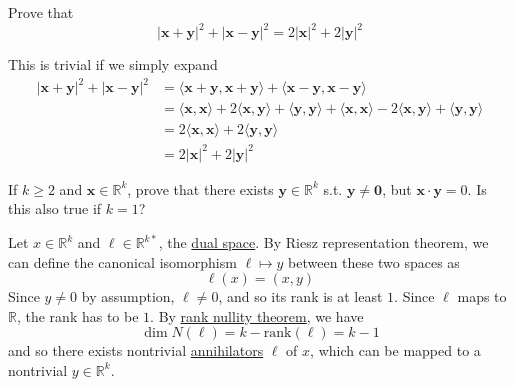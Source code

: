   \begin{exercise}[Rudin 1.17]
    Prove that
    \begin{equation}
      |\mathbf{x} + \mathbf{y}|^2 + |\mathbf{x} - \mathbf{y}|^2 = 2|\mathbf{x}|^2 + 2|\mathbf{y}|^2
    \end{equation}
  \end{exercise}
  \begin{solution}
    This is trivial if we simply expand 
    \begin{align}
      |\mathbf{x} + \mathbf{y}|^2 + |\mathbf{x} - \mathbf{y}|^2 & = \langle \mathbf{x} + \mathbf{y}, \mathbf{x} + \mathbf{y} \rangle + \langle \mathbf{x} - \mathbf{y}, \mathbf{x} - \mathbf{y} \rangle \\
      & = \langle \mathbf{x}, \mathbf{x} \rangle + 2 \langle \mathbf{x}, \mathbf{y} \rangle + \langle \mathbf{y}, \mathbf{y} \rangle + \langle \mathbf{x}, \mathbf{x} \rangle - 2 \langle \mathbf{x}, \mathbf{y} \rangle + \langle \mathbf{y}, \mathbf{y} \rangle \\
      & = 2 \langle \mathbf{x}, \mathbf{x} \rangle + 2 \langle \mathbf{y}, \mathbf{y} \rangle \\
      & = 2|\mathbf{x}|^2 + 2|\mathbf{y}|^2
    \end{align}
  \end{solution}

  \begin{exercise}[Rudin 1.18]
    If $k \geq 2$ and $\mathbf{x} \in \mathbb{R}^k$, prove that there exists $\mathbf{y} \in \mathbb{R}^k$ s.t. $\mathbf{y} \neq \mathbf{0}$, but $\mathbf{x} \cdot \mathbf{y} = 0$. Is this also true if $k = 1$? 
  \end{exercise}
  \begin{solution}
    Let $x \in \mathbb{R}^k$ and $\ell \in \mathbb{R}^{k \ast}$, the \hyperref[lin-def:dual-space]{dual space}. By Riesz representation theorem, we can define the canonical isomorphism $\ell \mapsto y$ between these two spaces as 
    \begin{equation}
      \ell (x) = (x, y)
    \end{equation}
    Since $y \neq 0$ by assumption, $\ell \neq 0$, and so its rank is at least $1$. Since $\ell$ maps to $\mathbb{R}$, the rank has to be $1$. By \hyperref[lin-thm:rank-nullity-theorem]{rank nullity theorem}, we have 
    \begin{equation}
      \dim N(\ell) = k - \mathrm{rank}(\ell) = k - 1
    \end{equation}
    and so there exists nontrivial \hyperref[lin-def:annihilator]{annihilators} $\ell$ of $x$, which can be mapped to a nontrivial $y \in \mathbb{R}^k$. 
  \end{solution}

